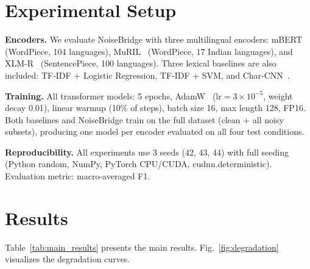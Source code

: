 \documentclass[conference]{IEEEtran}
\begin{document}
\section{Experimental Setup}
\label{sec:experiments}

\textbf{Encoders.} We evaluate NoiseBridge with three multilingual encoders: mBERT~\cite{devlin2019bert} (WordPiece, 104 languages), MuRIL~\cite{khanuja2021muril} (WordPiece, 17 Indian languages), and XLM-R~\cite{conneau2020xlmr} (SentencePiece, 100 languages). Three lexical baselines are also included: TF-IDF + Logistic Regression, TF-IDF + SVM, and Char-CNN~\cite{zhang2015character}.

\textbf{Training.} All transformer models: 5 epochs, AdamW~\cite{loshchilov2019decoupled} ($\text{lr} = 3 \times 10^{-5}$, weight decay 0.01), linear warmup (10\% of steps), batch size 16, max length 128, FP16. Both baselines and NoiseBridge train on the full dataset (clean + all noisy subsets), producing one model per encoder evaluated on all four test conditions.

\textbf{Reproducibility.} All experiments use 3 seeds (42, 43, 44) with full seeding (Python random, NumPy, PyTorch CPU/CUDA, cudnn.deterministic). Evaluation metric: macro-averaged F1.

\section{Results}
\label{sec:results}

Table~\ref{tab:main_results} presents the main results. Fig.~\ref{fig:degradation} visualizes the degradation curves.
\end{document}
